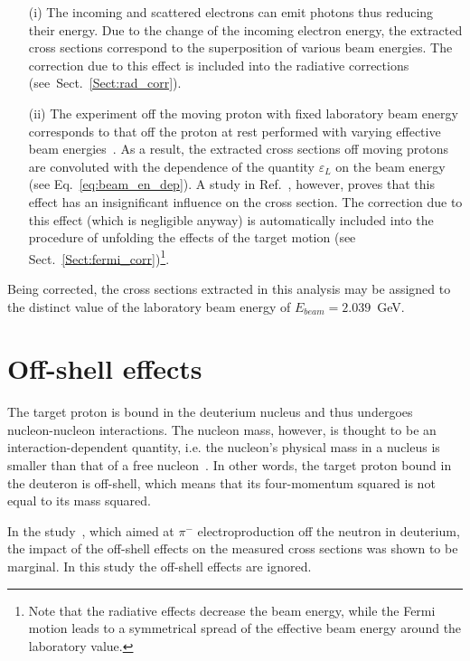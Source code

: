 \begin{itemize}
\item [(i)] The incoming and scattered electrons can emit photons thus reducing their energy. Due to the change of the incoming electron energy, the extracted cross sections correspond to the superposition of various beam energies. The correction due to this effect is included into the radiative corrections (see~Sect.~\ref{Sect:rad_corr}).
\item [(ii)] The experiment off the moving proton with fixed laboratory beam energy corresponds to that off the proton at rest performed with varying effective beam energies~\cite{twopeg-d}. As a result, the extracted cross sections off moving protons are convoluted with the dependence of the quantity  $\varepsilon_{L}$ on the beam energy (see Eq.~\eqref{eq:beam_en_dep}). A study in Ref.~\cite{twopeg-d}, however, proves that this effect has an insignificant influence on the cross section. The correction due to this effect (which is negligible anyway) is automatically included into the procedure of unfolding the effects of the target motion (see Sect.~\ref{Sect:fermi_corr})\footnote[1]{Note that the radiative effects decrease the beam energy, while the Fermi motion leads to a symmetrical spread of the effective beam energy around the laboratory value.}. 
\end{itemize}


Being corrected, the cross sections extracted in this analysis may be assigned to the distinct value of the laboratory beam energy of $E_{beam} = 2.039$~GeV.


\section{Off-shell effects}

The target proton is bound in the deuterium nucleus and thus undergoes nucleon-nucleon interactions. The nucleon mass, however, is thought to be an interaction-dependent quantity, i.e. the nucleon's physical mass in a nucleus is smaller than that of a free nucleon~\cite{Noble:1980my}. In other words, the target proton bound in the deuteron is off-shell, which means that its four-momentum squared is not equal to its mass squared.

In the study~\cite{Ye_Tian:2017}, which aimed at $\pi^{-}$ electroproduction off the neutron in deuterium, the impact of the off-shell effects on the measured cross sections was shown to be marginal. In this study the off-shell effects are ignored.





